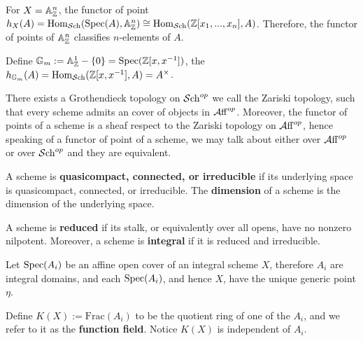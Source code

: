 \begin{example}
For $X=\mathbb{A}^n_{\mathbb{Z}}$, the functor of point $h_X(A)=\operatorname{Hom}_{\mathcal{S}\mathrm{ch}}(\operatorname{\mathrm{Spec}}(A),\mathbb{A}^n_{\mathbb{Z}})\cong \operatorname{Hom}_{\mathcal{S}\mathrm{ch}}(\mathbb{Z}[x_1,...,x_n], A)$. Therefore, the functor of points of $\mathbb{A}^n_{\mathbb{Z}}$ classifies $n$-elements of $A$.

Define $\mathbb{G}_m:=\mathbb{A}^1_{\mathbb{Z}}-\{0\}=\operatorname{\mathrm{Spec}}(\mathbb{Z}[x,x^{-1}])$, the $h_{\mathbb{G}_m}(A)=\operatorname{Hom}_{\mathcal{S}\mathrm{ch}}(\mathbb{Z}[x,x^{-1}], A)=A^\times$.
\end{example}

There exists a Grothendieck topology on $\mathcal{S}\mathrm{ch}^{op}$ we call the Zariski topology, such that every scheme 
admits an cover of objects in $\operatorname{\mathcal{A}ff}^{op}$. Moreover, the functor of points of a scheme is a sheaf respect to the Zariski topology on $\operatorname{\mathcal{A}ff}^{op}$, 
hence speaking of a functor of point of a scheme, we may talk about either over $\operatorname{\mathcal{A}ff}^{op}$ or over $\mathcal{S}\mathrm{ch}^{op}$ and they are equivalent.

\begin{definition}
A scheme is \textbf{quasicompact, connected, or irreducible} if its underlying space is quasicompact, connected, or irreducible. 
The \textbf{dimension} of a scheme is the dimension of the underlying space.
\end{definition}

\begin{definition}
A scheme is \textbf{reduced} if its stalk, or equivalently over all opens, have no nonzero nilpotent. Moreover, a scheme is \textbf{integral} if it is reduced and irreducible.

Let $\operatorname{\mathrm{Spec}}(A_i)$ be an affine open cover of an integral scheme $X$, therefore $A_i$ are integral domains, and each $\operatorname{\mathrm{Spec}}(A_i)$, and hence $X$, have the unique generic point $\eta$.

Define $K(X):=\mathrm{Frac}(A_i)$ to be the quotient ring of one of the $A_i$, and we refer to it as the \textbf{function field}. Notice $K(X)$ is independent of $A_i$.
\end{definition}

